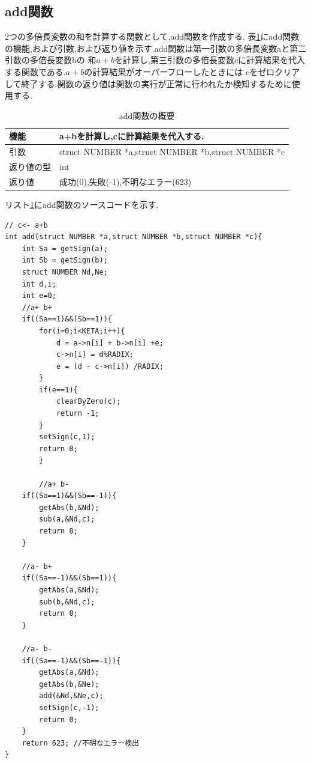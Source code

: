 \documentclass[a4j] {jarticle}
\begin{document}
\subsection{add関数}
2つの多倍長変数の和を計算する関数として,add関数を作成する.
表\ref{add}にadd関数の機能,および引数,および返り値を示す.add関数は第一引数の多倍長変数aと第二引数の多倍長変数bの
和$a+b$を計算し,第三引数の多倍長変数$c$に計算結果を代入する関数である.$a+b$の計算結果がオーバーフローしたときには
cをゼロクリアして終了する.関数の返り値は関数の実行が正常に行われたか検知するために使用する.
\begin{table}[H]
  \caption{add関数の概要}
  \label{add}
  \begin{center}
      \begin{tabular}{|l|l|}\hline
      機能 & a+bを計算し,cに計算結果を代入する.\\ \hline
      引数 & struct NUMBER *a,struct NUMBER *b,struct NUMBER *c\\ \hline
      返り値の型 & int\\ \hline
      返り値 & 成功(0),失敗(-1),不明なエラー(623)\\ \hline
      \end{tabular}
  \end{center}
  \end{table}

  リスト\ref{add}にadd関数のソースコードを示す.
  \begin{lstlisting}[basicstyle=\ttfamily\footnotesize, frame=single,label=add_pro,caption=add関数のソースコード]
// c<- a+b
int add(struct NUMBER *a,struct NUMBER *b,struct NUMBER *c){
    int Sa = getSign(a);
    int Sb = getSign(b);
    struct NUMBER Nd,Ne;
    int d,i;
    int e=0;
    //a+ b+
    if((Sa==1)&&(Sb==1)){
        for(i=0;i<KETA;i++){
            d = a->n[i] + b->n[i] +e;
            c->n[i] = d%RADIX;
            e = (d - c->n[i]) /RADIX;
        }
        if(e==1){
            clearByZero(c);
            return -1;
        }
        setSign(c,1);
        return 0;
        }
    
        //a+ b-
    if((Sa==1)&&(Sb==-1)){
        getAbs(b,&Nd);
        sub(a,&Nd,c);
        return 0;
    }

    //a- b+
    if((Sa==-1)&&(Sb==1)){
        getAbs(a,&Nd);
        sub(b,&Nd,c);
        return 0;
    }

    //a- b-
    if((Sa==-1)&&(Sb==-1)){
        getAbs(a,&Nd);
        getAbs(b,&Ne);
        add(&Nd,&Ne,c);
        setSign(c,-1);
        return 0;
    }
    return 623; //不明なエラー検出
}
  \end{lstlisting}
\end{document}
